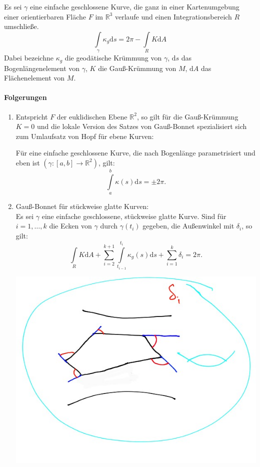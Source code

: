 \documentclass[a4paper,11pt,notitlepage]{report}
\theoremstyle{definition}
\newcommand{\R}{{\ensuremath{\mathbb{R}}}}
\begin{document}
\begin{theorem}
	Es sei $\gamma$ eine einfache geschlossene Kurve, die ganz in einer Kartenumgebung einer orientierbaren Fläche $F$ im $\R^3$ verlaufe und einen Integrationsbereich $R$ umschließe.
	$$\int\limits_{\gamma}{\kappa_g \mathrm{d}s} = 2 \pi - \int\limits_{R}{K \mathrm{d}A}$$
	Dabei bezeichne $\kappa_g$ die geodätische Krümmung von $\gamma$, $\mathrm{d}s$ das Bogenlängenelement von $\gamma$, $K$ die Gauß-Krümmung von $M$, $\mathrm{d}A$ das Flächenelement von $M$.
\end{theorem}

\paragraph{Folgerungen}
\begin{enumerate}
\item Entspricht $F$ der euklidischen Ebene $\R^2$, so gilt für die Gauß-Krümmung $K=0$ und die lokale Version des Satzes von Gauß-Bonnet spezialisiert sich zum Umlaufsatz von Hopf für ebene Kurven:

\begin{theorem}
Für eine einfache geschlossene Kurve, die nach Bogenlänge parametrisiert und eben ist $(\gamma \colon [a,b] \rightarrow \R^2)$, gilt:
$$\int\limits_{a}^{b}{\kappa(s) \mathrm{d}s} = \pm 2 \pi.$$
\end{theorem}

\item Gauß-Bonnet für stückweise glatte Kurven:
\\ Es sei $\gamma$ eine einfache geschlossene, stückweise glatte Kurve.
Sind für $i= 1, \ldots, k$ die Ecken von $\gamma$ durch $\gamma(t_i)$ gegeben, die Außenwinkel mit $\delta_i$, so gilt:
$$\int\limits_R K \mathrm{d}A + \sum\limits_{i=2}^{k+1}{\int\limits_{t_{i-1}}^{t_i}{\kappa_g(s) \mathrm{d}s + \sum\limits_{i=1}^k{\delta_i}}} = 2 \pi.$$

\begin{center}
	\includegraphics[scale=0.3]{images/2012_02_06_Bild1.jpg}
\end{center}


\end{enumerate}
\end{document}
